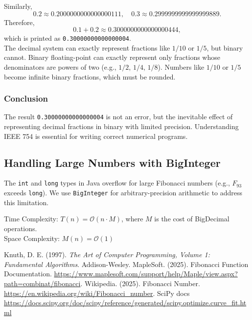 \documentclass{article}
\begin{document}
Similarly,
\[
0.2 \approx 0.2000000000000000111, \quad
0.3 \approx 0.2999999999999999889.
\]
Therefore,
\[
0.1 + 0.2 \approx 0.3000000000000000444,
\]
which is printed as \texttt{0.30000000000000004}.
\\
The decimal system can exactly represent fractions like $1/10$ or $1/5$,
but binary cannot. Binary floating-point can exactly represent only fractions
whose denominators are powers of two (e.g., $1/2$, $1/4$, $1/8$). Numbers like
$1/10$ or $1/5$ become infinite binary fractions, which must be rounded.

\subsubsection{Conclusion}
The result \texttt{0.30000000000000004} is not an error, but the inevitable
effect of representing decimal fractions in binary with limited precision.
Understanding IEEE 754 is essential for writing correct numerical programs.

\subsection{Handling Large Numbers with BigInteger}
The \texttt{int} and \texttt{long} types in Java overflow for large Fibonacci numbers (e.g., $F_{93}$ exceeds \texttt{long}). We use \texttt{BigInteger} for arbitrary-precision arithmetic to address this limitation.

Time Complexity: $T(n) = \mathcal{O}(n \cdot M)$, where $M$ is the cost of BigDecimal operations. \\
Space Complexity: $M(n) = \mathcal{O}(1)$



\begin{thebibliography}{9}
Knuth, D. E. (1997). \textit{The Art of Computer Programming, Volume 1: Fundamental Algorithms}. Addison-Wesley.
MapleSoft. (2025). Fibonacci Function Documentation. \url{https://www.maplesoft.com/support/help/Maple/view.aspx?path=combinat/fibonacci}.
Wikipedia. (2025). Fibonacci Number. \url{https://en.wikipedia.org/wiki/Fibonacci_number}.
SciPy docs \url{https://docs.scipy.org/doc/scipy/reference/generated/scipy.optimize.curve_fit.html}
\end{thebibliography}
\end{document}
